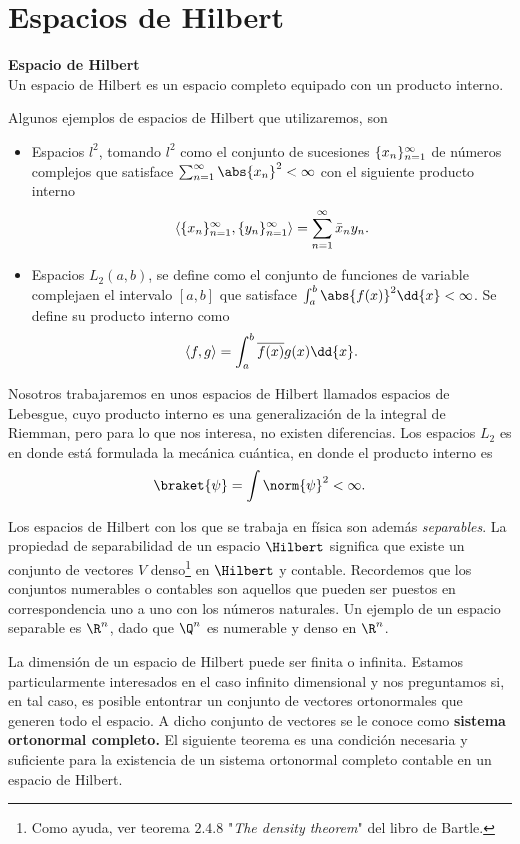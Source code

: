 \pagebreak


\section*{Espacios de Hilbert}



\begin{mdframed}[style=warning]
	{\large \textbf{Espacio de Hilbert}} \\
	Un espacio de Hilbert es un espacio completo equipado con un producto interno.
\end{mdframed}

Algunos ejemplos de espacios de Hilbert que utilizaremos, son
\begin{itemize}
	\item Espacios $l^2$, tomando $l^2$ como el conjunto de sucesiones $\{ x_{n} \} _{n = 1} ^\infty$ de números complejos que satisface $\sum _{n = 1} ^\infty \abs{x_n} ^2 < \infty$ con el siguiente producto interno
		$$ \langle \{ x_{n} \} _{n = 1} ^\infty , \{ y_{n} \} _{n = 1} ^\infty \rangle = \sum _{n = 1} ^\infty \bar{x} _n y_n . $$
	\item Espacios $L_2 (a,b)$, se define como el conjunto de funciones de variable complejaen el intervalo $[a,b]$ que satisface $\int _a ^b \abs{f(x)}^2 \dd{x} < \infty$. Se define su producto interno como
		$$ \inner{f}{g} = \int _a ^b \overline{f(x)} g(x) \dd{x} . $$
\end{itemize}


Nosotros trabajaremos en unos espacios de Hilbert llamados espacios de Lebesgue, cuyo producto interno es una generalización de la integral de Riemman, pero para lo que nos interesa, no existen diferencias. Los espacios $L_2$ es en donde está formulada la mecánica cuántica, en donde el producto interno es
	$$ \braket{\psi} = \int \norm{\psi} ^2 < \infty . $$


Los espacios de Hilbert con los que se trabaja en física son además \textit{separables}. La propiedad de separabilidad de un espacio $\Hilbert$ significa que existe un conjunto de vectores $V$ denso\footnote{Como ayuda, ver teorema $2.4.8$ "\textit{The density theorem}" del libro de Bartle.} en $\Hilbert$ y contable. Recordemos que los conjuntos numerables o contables son aquellos que pueden ser puestos en correspondencia uno a uno con los números naturales. Un ejemplo de un espacio separable es $\R ^n$, dado que $\Q ^n$ es numerable y denso en $\R ^n$.



La dimensión de un espacio de Hilbert puede ser finita o infinita. Estamos particularmente interesados en el caso infinito dimensional y nos preguntamos si, en tal caso, es posible entontrar un conjunto de vectores ortonormales que generen todo el espacio. A dicho conjunto de vectores se le conoce como \textbf{sistema ortonormal completo.} El siguiente teorema es una condición necesaria y suficiente para la existencia de un sistema ortonormal completo contable en un espacio de Hilbert.


